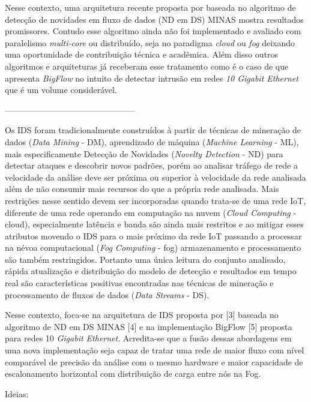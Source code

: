 Nesse contexto, uma arquitetura recente proposta por 
baseada no algoritmo de detecção de novidades em fluxo de dados (ND em DS) MINAS
\cite{Faria2016minas} mostra resultados promissores. Contudo esse algoritmo
ainda não foi implementado e avaliado com paralelismo \emph{multi-core} ou
distribuído, seja no paradigma \emph{cloud} ou \emph{fog} deixando uma
oportunidade de contribuição técnica e acadêmica. Além disso outros algoritmos e
arquiteturas já receberam esse tratamento como é o caso de
 que apresenta \emph{BigFlow} no intuito de detectar
intrusão em redes \emph{10 Gigabit Ethernet} que é um volume considerável.

-----------------------------------------------

Os IDS foram tradicionalmente construídos à partir de técnicas de mineração de
dados (\emph{Data Mining} - DM), aprendizado de máquina (\emph{Machine Learning} - ML), mais
especificamente Detecção de Novidades (\emph{Novelty Detection} - ND) para detectar
ataques e descobrir novos padrões, porém ao analisar tráfego de rede a
velocidade da análise deve ser próxima ou superior à velocidade da rede
analisada além de não consumir mais recursos do que a própria rede analisada.
Mais restrições nesse sentido devem ser incorporadas quando trata-se de uma rede
IoT, diferente de uma rede operando em computação na nuvem (\emph{Cloud Computing} - cloud),
especialmente latência e banda são ainda mais restritos e ao mitigar
esses atributos movendo o IDS para o mais próximo da
rede IoT passando a processar na névoa computacional (\emph{Fog Computing} - fog)
armazenamento e processamento são também restringidos. Portanto uma única
leitura do conjunto analisado, rápida atualização e distribuição do modelo de
detecção e resultados em tempo real são características positivas encontradas
nas técnicas de mineração e processamento de fluxos de dados (\emph{Data Streams} -
DS).

Nesse contexto, foca-se na arquitetura de IDS proposta por [3] baseada no
algoritmo de ND em DS MINAS [4] e na implementação BigFlow [5] proposta para
redes 10 \emph{Gigabit Ethernet}. Acredita-se que a fusão dessas abordagens em uma nova
implementação seja capaz de tratar uma rede de maior fluxo com nível comparável
de precisão da análise com o mesmo hardware e maior capacidade de escalonamento
horizontal com distribuição de carga entre nós na Fog.

Ideias:

